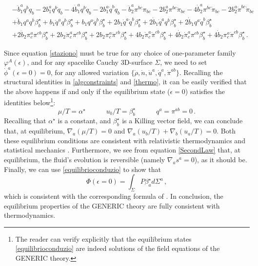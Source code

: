 \documentclass[a4paper, amsfonts, amssymb, amsmath, reprint, showkeys, nofootinbib, twoside, onecolumn, notitlepage]{revtex4-1}
\newcommand{\spc}{\quad \quad \quad}
\theoremstyle{definition}
\theoremstyle{theorem}
\begin{document}
\begin{fleqn}
\begin{equation}
\begin{split}
\\
& - \ddot{b}_1^a q^b q_b-2b_1^a q^b \ddot{q}_b - 4\dot{b}_1^a q^b \dot{q}_b - 2b_1^a \dot{q}^b \dot{q}_b   - \ddot{b}_2^a \pi^{bc} \pi_{bc} -2b_2^a \pi^{bc}\ddot{\pi}_{bc}-4\dot{b}_2^a \pi^{bc}\dot{\pi}_{bc} -2b_2^a \dot{\pi}^{bc}\dot{\pi}_{bc} 
\\
& + \ddot{b}_1 q^a q^b \beta^\star_b+b_1 \ddot{q}^a q^b \beta^\star_b +b_1 q^a \ddot{q}^b \beta^\star_b +2 b_1 \dot{q}^a \dot{q}^b \beta^\star_b + 2\dot{b}_1 \dot{q}^a q^b \beta^\star_b + 2\dot{b}_1 q^a \dot{q}^b \beta^\star_b
\\
& +2\ddot{b}_2 \pi^a_c\pi^{cb}\beta^\star_b + 2b_2 \ddot{\pi}^a_c\pi^{cb}\beta^\star_b +2b_2 \pi^a_c\ddot{\pi}^{cb}\beta^\star_b +4b_2 \dot{\pi}^a_c\dot{\pi}^{cb}\beta^\star_b +4\dot{b}_2 \dot{\pi}^a_c\pi^{cb}\beta^\star_b +4\dot{b}_2 \pi^a_c\dot{\pi}^{cb}\beta^\star_b \, .  
\end{split}
\end{equation}
\end{fleqn}
Since equation \eqref{staziono} must be true for any choice of one-parameter family $\varphi^A(\epsilon)$, and for any spacelike Cauchy 3D-surface $\Sigma$, we need to set $\dot{\phi}^a(\epsilon=0)=0$, for any allowed variation $\{\dot{\rho},\dot{n},\dot{u}^a,\dot{q}^a,\dot{\pi}^{ab} \}$. Recalling the structural identities in \eqref{algconstraints} and \eqref{thermo}, it can be easily verified  that the above happens if and only if the equilibrium state ($\epsilon=0$) satisfies the identities below\footnote{The reader can verify explicitly that the equilibrium states \eqref{equilibrioconduzio} are indeed solutions of the field equations of the GENERIC theory.}:
\begin{equation}\label{equilibrioconduzio}
\mu/T = \alpha^\star \spc u_b/T = \beta^\star_b \spc q^a=\pi^{ab}=0 \, .
\end{equation}
Recalling that $\alpha^\star$ is a constant, and $\beta^\star_b$ is a Killing vector field, we can conclude that, at equilibrium, $\nabla_a(\mu/T)=0$ and $\nabla_{a}(u_b/T)+\nabla_b (u_a/T)=0$. Both these equilibrium conditions are consistent with relativistic thermodynamics \cite{Israel_Stewart_1979} and statistical mechanics \cite{BecattiniBeta2016}. Furthermore, we see from equation \eqref{SecondLaw} that, at equilibrium, the fluid's evolution is reversible (namely $\nabla_a s^a =0$), as it should be. Finally, we can use \eqref{equilibrioconduzio} to show that
\begin{equation}\label{Hawk}
\Phi(\epsilon=0)= \int_\Sigma P \beta^\star_a d\Sigma^a \, ,
\end{equation}
which is consistent with the corresponding formula of \citet{GibbonsHawking1977}. 
In conclusion, the equilibrium properties of the GENERIC theory are fully consistent with thermodynamics. 
 
\end{document}
